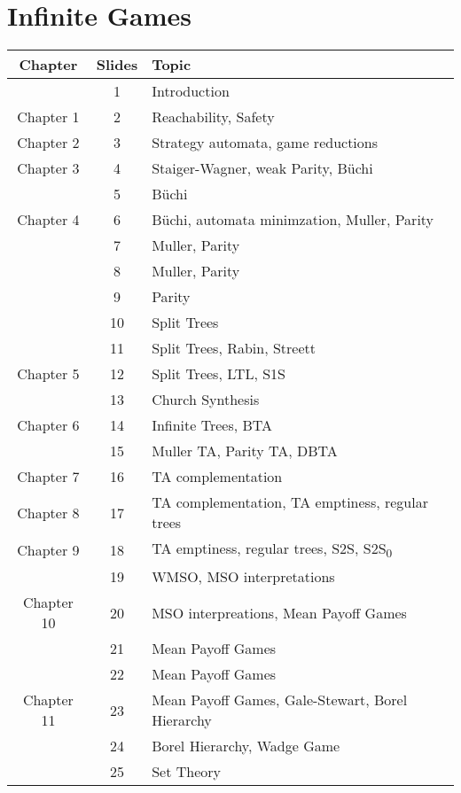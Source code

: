 \documentclass{article}
\begin{document}
\section*{Infinite Games}
\begin{tabular}{c|c|l}
	\textbf{Chapter} & \textbf{Slides} & \textbf{Topic} \\ \hline
	& 1 & Introduction
	\\ \hline
	Chapter 1 & 2 & Reachability, Safety
	\\ \hline
	Chapter 2 & 3 & Strategy automata, game reductions
	\\ \hline
	Chapter 3 & 4 & Staiger-Wagner, weak Parity, Büchi
	\\ \hline
	& 5 & Büchi
	\\ \hline
	Chapter 4 & 6 & Büchi, automata minimzation, Muller, Parity
	\\ \hline
	& 7 & Muller, Parity
	\\ \hline
	& 8 & Muller, Parity
	\\ \hline
	& 9 & Parity
	\\ \hline
	& 10 & Split Trees
	\\ \hline
	& 11 & Split Trees, Rabin, Streett
	\\ \hline
	Chapter 5 & 12 & Split Trees, LTL, S1S
	\\ \hline
	& 13 & Church Synthesis
	\\ \hline
	Chapter 6 & 14 & Infinite Trees, BTA
	\\ \hline
	& 15 & Muller TA, Parity TA, DBTA
	\\ \hline
	Chapter 7 & 16 & TA complementation
	\\ \hline
	Chapter 8 & 17 & TA complementation, TA emptiness, regular trees
	\\ \hline
	Chapter 9 & 18 & TA emptiness, regular trees, S2S, S2S\textsubscript{0}
	\\ \hline
	& 19 & WMSO, MSO interpretations
	\\ \hline
	Chapter 10 & 20 & MSO interpreations, Mean Payoff Games
	\\ \hline
	& 21 & Mean Payoff Games
	\\ \hline
	& 22 & Mean Payoff Games
	\\ \hline
	Chapter 11 & 23 &  Mean Payoff Games, Gale-Stewart, Borel Hierarchy
	\\ \hline
	& 24 & Borel Hierarchy, Wadge Game
	\\ \hline
	& 25 & Set Theory
\end{tabular}
\newpage
\end{document}
